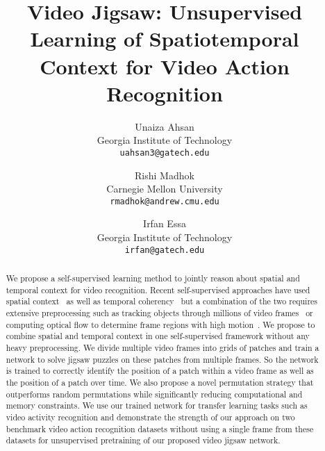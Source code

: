\documentclass[10pt,twocolumn,letterpaper]{article}
\begin{document}
\title{Video Jigsaw: Unsupervised Learning of Spatiotemporal Context for Video Action Recognition}

\author{Unaiza Ahsan \\
Georgia Institute of Technology\\
{\tt\small uahsan3@gatech.edu}
\and
Rishi Madhok \\
Carnegie Mellon University\\
{\tt\small rmadhok@andrew.cmu.edu}
\and
Irfan Essa \\
Georgia Institute of Technology\\
{\tt\small irfan@gatech.edu}
}

\maketitle
\ifwacvfinal\thispagestyle{empty}\fi

\begin{abstract}
   We propose a self-supervised learning method to jointly reason about spatial and temporal context for video recognition. Recent self-supervised approaches have used spatial context~\cite{doersch2015unsupervised,noroozi2016unsupervised} as well as temporal coherency~\cite{misra2016shuffle} but a combination of the two requires extensive preprocessing such as tracking objects through millions of video frames~\cite{wang2017transitive} or computing optical flow to determine frame regions with high motion~\cite{lee2017unsupervised}. We propose to combine spatial and temporal context in one self-supervised framework without any heavy preprocessing. We divide multiple video frames into grids of patches and train a network to solve jigsaw puzzles on these patches from multiple frames. So the network is trained to correctly identify the position of a patch within a video frame as well as the position of a patch over time. We also propose a novel permutation strategy that outperforms random permutations while significantly reducing computational and memory constraints. We use our trained network for transfer learning tasks such as video activity recognition and demonstrate the strength of our approach on two benchmark video action recognition datasets without using a single frame from these datasets for unsupervised pretraining of our proposed video jigsaw network.
\end{abstract}
\end{document}
